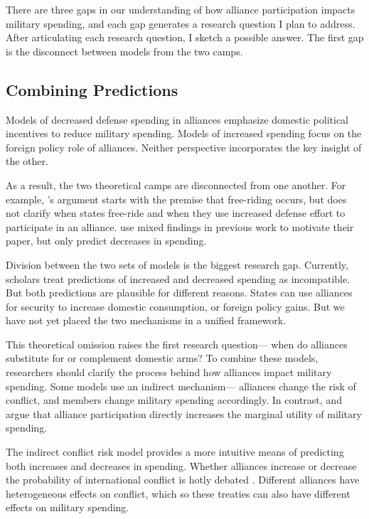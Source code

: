 \documentclass[12pt]{article}
\begin{document}
There are three gaps in our understanding of how alliance participation impacts military spending, and each gap generates a research question I plan to address. 
After articulating each research question, I sketch a possible answer. 
The first gap is the disconnect between models from the two camps. 



\subsection{Combining Predictions} %


Models of decreased defense spending in alliances emphasize domestic political incentives to reduce military spending. 
Models of increased spending focus on the foreign policy role of alliances. 
Neither perspective incorporates the key insight of the other.


As a result, the two theoretical camps are disconnected from one another. 
For example, \citet{Horowitzetal2017}'s argument starts with the premise that free-riding occurs, but does not clarify when states free-ride and when they use increased defense effort to participate in an alliance. 
\citet{DigiuseppePoast2016} use mixed findings in previous work to motivate their paper, but only predict decreases in spending. 


Division between the two sets of models is the biggest research gap. 
Currently, scholars treat predictions of increased and decreased spending as incompatible. 
But both predictions are plausible for different reasons. 
States can use alliances for security to increase domestic consumption, or foreign policy gains. 
But we have not yet placed the two mechanisms in a unified framework. 


This theoretical omission raises the first research question--- when do alliances substitute for or complement domestic arms? 
To combine these models, researchers should clarify the process behind how alliances impact military spending. 
Some models use an indirect mechanism--- alliances change the risk of conflict, and members change military spending accordingly. 
In contrast, \citet{Diehl1994} and \citet{MorganPalmer2006} argue that alliance participation directly increases the marginal utility of military spending.


The indirect conflict risk model provides a more intuitive means of predicting both increases and decreases in spending.
Whether alliances increase or decrease the probability of international conflict is hotly debated \citep{SiversonSullivan1984, Smith1995, Colaresi2005, JohnsonLeeds2011, Kenwicketal2015, Kang2017}.
Different alliances have heterogeneous effects on conflict, which so these treaties can also have different effects on military spending. 
\end{document}
